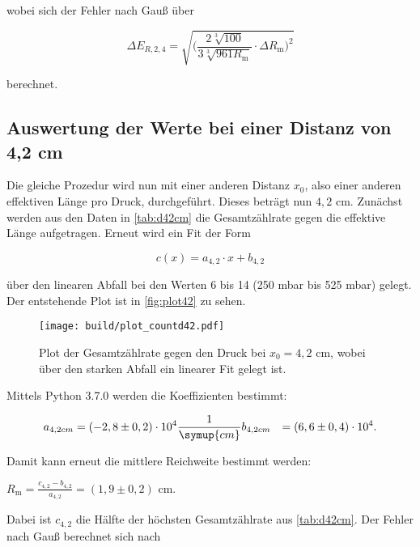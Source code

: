 wobei sich der Fehler nach Gauß über

\begin{equation}
\label{eqn:fehlerenergie}
    \Delta E_{R,2,4} = \sqrt{ \bigg ( \dfrac{2\sqrt[3]{100}}{3\sqrt[3]{961 R_\text{m}}} \cdot \Delta R_\text{m} \bigg)^2 }
\end{equation}

berechnet.

\subsection{Auswertung der Werte bei einer Distanz von 4,2 cm}

Die gleiche Prozedur wird nun mit einer anderen Distanz $x_0$, also einer anderen effektiven Länge pro Druck, durchgeführt. Dieses beträgt nun $4,2$ cm.
Zunächst werden aus den Daten in \autoref{tab:d42cm} die Gesamtzählrate gegen die effektive Länge aufgetragen. Erneut wird ein Fit der Form

\begin{equation}
    c(x) = a_{4,2} \cdot x + b_{4,2}
\end{equation}

über den linearen Abfall bei den Werten 6 bis 14 (250 mbar bis 525 mbar) gelegt. Der entstehende Plot ist in \autoref{fig:plot42} zu sehen.



\begin{figure}
    \centering
    \texttt{[image: build/plot\_countd42.pdf]}
    \caption{Plot der Gesamtzählrate gegen den Druck bei $x_0 = 4,2$ cm, wobei über den starken Abfall ein linearer Fit gelegt ist.}
    \label{fig:plot42}
\end{figure}

Mittels Python 3.7.0 werden die Koeffizienten bestimmt:

\begin{align}
    a_{4,2cm} &= (-2,8 \pm 0,2) \cdot 10^{4} \frac{1}{\symup{cm}}
    b_{4,2cm} &= (6,6 \pm 0,4) \cdot 10^{4}.
\end{align}

Damit kann erneut die mittlere Reichweite bestimmt werden:

\begin{center}
    $R_\text{m} = \frac{c_{4,2} - b_{4,2}}{a_{4,2}} = (1,9 \pm 0,2)$ cm.
\end{center}

Dabei ist $c_{4,2}$ die Hälfte der höchsten Gesamtzählrate aus \autoref{tab:d42cm}. Der Fehler nach  Gauß berechnet sich nach

